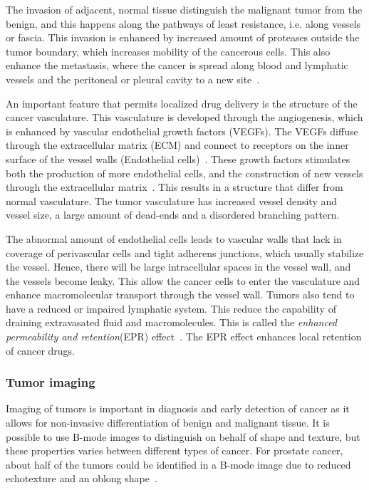 The invasion of adjacent, normal tissue distinguish the malignant tumor from the benign, and this happens along  the pathways of least resistance, i.e. along vessels or fascia. This invasion is enhanced by increased amount of proteases outside the tumor boundary, which increases mobility of the cancerous cells. This also enhance the metastasis, where the cancer is spread along blood and lymphatic vessels and the peritoneal or pleural cavity to a new site~\cite{king2006cancer}.
 
An important feature that permits localized drug delivery is the structure of the cancer vasculature. This vasculature is developed through the angiogenesis, which is enhanced by vascular endothelial growth factors (VEGFs). The VEGFs diffuse through the extracellular matrix (ECM) and connect to receptors on the inner surface of the vessel walls (Endothelial cells)~\cite{Koumoutsakos2013}. These growth factors stimulates both the production of more endothelial cells, and the construction of new vessels through the extracellular matrix~\cite{Nishida2006}. This results in a structure that differ from normal vasculature. The tumor vasculature has increased vessel density and vessel size, a large amount of dead-ends and a disordered branching pattern.    

The abnormal amount of endothelial cells leads to vascular walls that lack in coverage of perivascular cells and tight adherens junctions, which usually stabilize the vessel. Hence, there will be large intracellular spaces in the vessel wall, and the vessels become leaky. This allow the cancer cells to enter the vasculature and enhance macromolecular transport through the vessel wall. Tumors also tend to have a reduced or impaired lymphatic system. This reduce the capability of draining extravasated fluid and macromolecules. This is called the \textit{enhanced permeability and retention}(EPR) effect~\cite{Matsumura1986}. The EPR effect enhances local retention of cancer drugs.



\subsubsection{Tumor imaging}
Imaging of tumors is important in diagnosis and early detection of cancer as it allows for non-invasive differentiation of benign and malignant tissue. It is possible to use B-mode images to distinguish on behalf of shape and texture, but these properties varies between different types of cancer. For prostate cancer, about half of the tumors could be identified in a B-mode image due to reduced echotexture and an oblong shape~\cite{Halpern2006}. 

